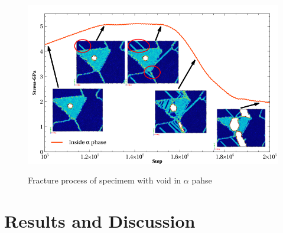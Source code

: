 \documentclass[final,5p,times,twocolumn]{elsarticle}
\begin{document}
\begin{figure}
	\centering
	\includegraphics[width=1\linewidth]{img/process-ia}
	\label{fig:process.ia}
	\caption{Fracture process of specimem with void in $\alpha$ pahse}
\end{figure}

\section{Results and Discussion}
\end{document}
